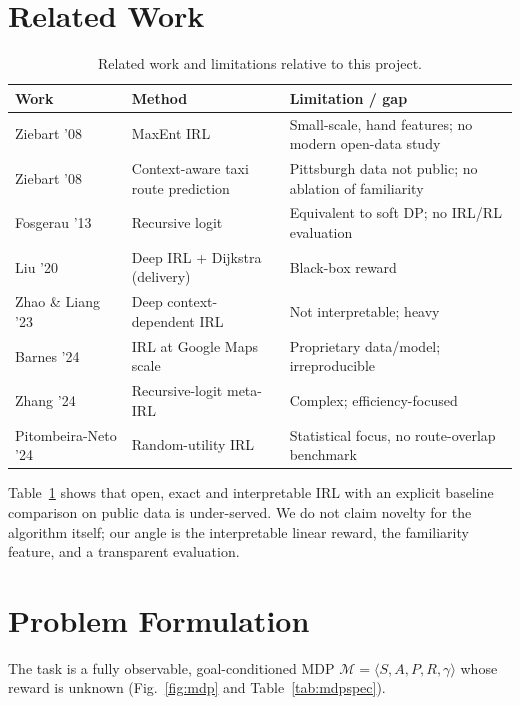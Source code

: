 \documentclass{ieeeaccess}
\begin{document}
\section{Related Work}\label{sec:related}
\begin{table}[t]
\centering\footnotesize
\caption{Related work and limitations relative to this project.}\label{tab:related}
\begin{tabular}{@{}>{\raggedright\arraybackslash}p{1.9cm}>{\raggedright\arraybackslash}p{2.5cm}>{\raggedright\arraybackslash}p{3.0cm}@{}}
\toprule
Work & Method & Limitation / gap\\
\midrule
Ziebart '08~\cite{ziebart2008maxent} & MaxEnt IRL & Small-scale, hand features; no modern open-data study\\
Ziebart '08~\cite{ziebart2008cabbie} & Context-aware taxi route prediction & Pittsburgh data not public; no ablation of familiarity\\
Fosgerau '13~\cite{fosgerau2013} & Recursive logit & Equivalent to soft DP; no IRL/RL evaluation\\
Liu '20~\cite{liu2020} & Deep IRL + Dijkstra (delivery) & Black-box reward\\
Zhao \& Liang '23~\cite{zhao2023} & Deep context-dependent IRL & Not interpretable; heavy\\
Barnes '24~\cite{barnes2024} & IRL at Google Maps scale & Proprietary data/model; irreproducible\\
Zhang '24~\cite{zhang2024} & Recursive-logit meta-IRL & Complex; efficiency-focused\\
Pitombeira-Neto '24~\cite{pitombeira2024} & Random-utility IRL & Statistical focus, no route-overlap benchmark\\
\bottomrule
\end{tabular}
\end{table}
Table~\ref{tab:related} shows that open, exact and interpretable IRL with an explicit baseline comparison on public data is under-served. We do not claim novelty for the algorithm itself; our angle is the interpretable linear reward, the familiarity feature, and a transparent evaluation.

\section{Problem Formulation}\label{sec:problem}
The task is a fully observable, goal-conditioned MDP $\mathcal M=\langle S,A,P,R,\gamma\rangle$ whose reward is unknown (Fig.~\ref{fig:mdp} and Table~\ref{tab:mdpspec}).
\end{document}
